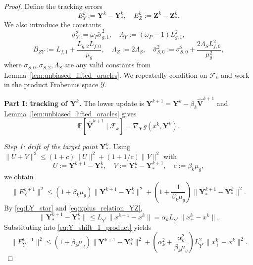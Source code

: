 \documentclass{pkumelon}
\theoremstyle{plain}
\newcommand{\E}{\mathbb{E}}
\begin{document}
\begin{proof}
Define the tracking errors
\begin{equation*}
E_Y^k:=\boldsymbol Y^k-\boldsymbol Y_*^k, \quad E_Z^k:=\boldsymbol Z^k-\boldsymbol Z_*^k.
\end{equation*}
We also introduce the constants
\begin{equation*}
\sigma_Y^2:=\omega_P\tilde\sigma_{g,1}^2, \quad \Lambda_Y:=(\omega_P-1)L_{g,1}^2,
\end{equation*}
\begin{equation*}
B_{ZY}:=L_{f,1}+\frac{L_{g,2}L_{f,0}}{\mu_g}, \quad \Lambda_Z:=2\Lambda_S, \quad \bar\sigma_{S,0}^2:=\sigma_{S,0}^2+\frac{2\Lambda_S L_{f,0}^2}{\mu_g^2},
\end{equation*}
where $\sigma_{S,0},\sigma_{S,2},\Lambda_S$ are any valid constants from Lemma~\ref{lem:unbiased_lifted_oracles}. We repeatedly condition on $\mathcal F_k$ and work in the product Frobenius space $\mathcal Y$.

\textbf{Part I: tracking of $\boldsymbol Y^k$. }
The lower update is $\boldsymbol Y^{k+1}=\boldsymbol Y^k-\beta_k\widehat{\boldsymbol V}^{k+1}$ and Lemma~\ref{lem:unbiased_lifted_oracles} gives
\begin{equation*}
\E[\widehat{\boldsymbol V}^{k+1}\mid \mathcal F_k] = \nabla_{\boldsymbol Y}g(x^k,\boldsymbol Y^k).
\end{equation*}

\emph{Step 1: drift of the target point $\boldsymbol Y_*^k$.} Using $\|U+V\|^2\le (1+c)\|U\|^2+(1+1/c)\|V\|^2$ with
\begin{equation*}
U:=\boldsymbol Y^{k+1}-\boldsymbol Y_*^k, \quad V:=\boldsymbol Y_*^k-\boldsymbol Y_*^{k+1}, \quad c:=\beta_k\mu_g,
\end{equation*}
we obtain
\begin{equation}\label{eq:Y_shift_1_product}
\|E_Y^{k+1}\|^2
\le
(1+\beta_k\mu_g)\|\boldsymbol Y^{k+1}-\boldsymbol Y_*^k\|^2
+\left(1+\frac{1}{\beta_k\mu_g}\right)\|\boldsymbol Y_*^{k+1}-\boldsymbol Y_*^k\|^2.
\end{equation}
By \eqref{eq:LY_star} and \eqref{eq:xplus_relation_YZ},
\begin{equation*}
\|\boldsymbol Y_*^{k+1}-\boldsymbol Y_*^k\| \le L_{Y^*}\|x^{k+1}-x^k\| = \alpha_k L_{Y^*}\|x_+^k-x^k\|.
\end{equation*}
Substituting into \eqref{eq:Y_shift_1_product} yields
\begin{equation}\label{eq:Y_shift_2_product}
\|E_Y^{k+1}\|^2
\le
(1+\beta_k\mu_g)\|\boldsymbol Y^{k+1}-\boldsymbol Y_*^k\|^2
+\left(\alpha_k^2+\frac{\alpha_k^2}{\beta_k\mu_g}\right)L_{Y^*}^2\|x_+^k-x^k\|^2.
\end{equation}


\end{proof}
\end{document}
